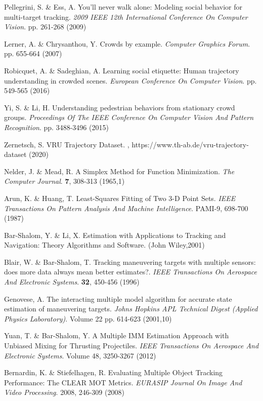 \begin{thebibliography}{00}
Pellegrini, S. \& Ess, A. You'll never walk alone: Modeling social behavior for multi-target tracking. {\em 2009 IEEE 12th International Conference On Computer Vision}. pp. 261-268 (2009)


Lerner, A. \& Chrysanthou, Y. Crowds by example. {\em Computer Graphics Forum}. pp. 655-664 (2007)


Robicquet, A. \& Sadeghian, A. Learning social etiquette: Human trajectory understanding in crowded scenes. {\em European Conference On Computer Vision}. pp. 549-565 (2016)


Yi, S. \& Li, H. Understanding pedestrian behaviors from stationary crowd groups. {\em Proceedings Of The IEEE Conference On Computer Vision And Pattern Recognition}. pp. 3488-3496 (2015)


Zernetsch, S. VRU Trajectory Dataset. , https://www.th-ab.de/vru-trajectory-dataset (2020)

Nelder, J. \& Mead, R. A Simplex Method for Function Minimization. {\em The Computer Journal}. \textbf{7}, 308-313 (1965,1)


Arun, K. \& Huang, T. Least-Squares Fitting of Two 3-D Point Sets. {\em IEEE Transactions On Pattern Analysis And Machine Intelligence}. PAMI-9, 698-700 (1987)


Bar-Shalom, Y. \& Li, X. Estimation with Applications to Tracking and Navigation: Theory Algorithms and Software. (John Wiley,2001)


Blair, W. \& Bar-Shalom, T. Tracking maneuvering targets with multiple sensors: does more data always mean better estimates?. {\em IEEE Transactions On Aerospace And Electronic Systems}. \textbf{32}, 450-456 (1996)


Genovese, A. The interacting multiple model algorithm for accurate state estimation of maneuvering targets. {\em Johns Hopkins APL Technical Digest (Applied Physics Laboratory)}. Volume 22 pp. 614-623 (2001,10)


Yuan, T. \& Bar-Shalom, Y. A Multiple IMM Estimation Approach with Unbiased Mixing for Thrusting Projectiles. {\em IEEE Transactions On Aerospace And Electronic Systems}. Volume 48, 3250-3267 (2012)


Bernardin, K. \& Stiefelhagen, R. Evaluating Multiple Object Tracking Performance: The CLEAR MOT Metrics. {\em EURASIP Journal On Image And Video Processing}. 2008, 246-309 (2008)



\end{thebibliography}
